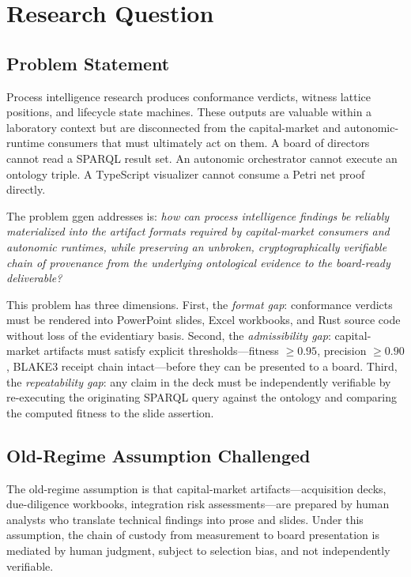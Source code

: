 
\section{Research Question}
\label{sec:ggen-rq}

\subsection{Problem Statement}
\label{sec:ggen-rq-problem}

Process intelligence research produces conformance verdicts, witness lattice positions, and
lifecycle state machines. These outputs are valuable within a laboratory context but are
disconnected from the capital-market and autonomic-runtime consumers that must ultimately act on
them. A board of directors cannot read a SPARQL result set. An autonomic orchestrator cannot
execute an ontology triple. A TypeScript visualizer cannot consume a Petri net proof directly.

The problem ggen addresses is: \emph{how can process intelligence findings be reliably
materialized into the artifact formats required by capital-market consumers and autonomic runtimes,
while preserving an unbroken, cryptographically verifiable chain of provenance from the underlying
ontological evidence to the board-ready deliverable?}

This problem has three dimensions. First, the \emph{format gap}: conformance verdicts must be
rendered into PowerPoint slides, Excel workbooks, and Rust source code without loss of the
evidentiary basis. Second, the \emph{admissibility gap}: capital-market artifacts must satisfy
explicit thresholds---fitness $\geq 0.95$, precision $\geq 0.90$, BLAKE3 receipt chain
intact---before they can be presented to a board. Third, the \emph{repeatability gap}: any claim
in the deck must be independently verifiable by re-executing the originating SPARQL query against
the ontology and comparing the computed fitness to the slide assertion.

\subsection{Old-Regime Assumption Challenged}
\label{sec:ggen-rq-old-regime}

The old-regime assumption is that capital-market artifacts---acquisition decks, due-diligence
workbooks, integration risk assessments---are prepared by human analysts who translate technical
findings into prose and slides. Under this assumption, the chain of custody from measurement to
board presentation is mediated by human judgment, subject to selection bias, and not independently
verifiable.

